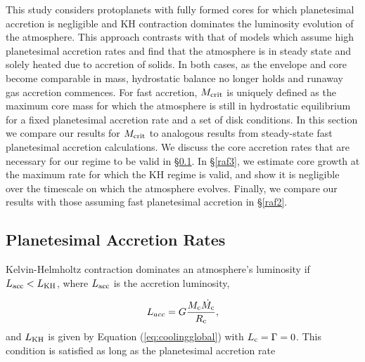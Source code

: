 

This study considers protoplanets with fully formed cores for which planetesimal accretion is negligible and KH contraction dominates the luminosity evolution of the atmosphere. This approach contrasts with that of models which assume high planetesimal accretion rates and find that the atmosphere is in steady state and solely heated due to accretion of solids. In both cases, as the envelope and core become comparable in mass, hydrostatic balance no longer holds and runaway gas accretion commences. For fast accretion, $M_{\rm crit}$ is uniquely defined as the maximum core mass for which the atmosphere is still in hydrostatic equilibrium for a fixed planetesimal accretion rate and a set of disk conditions. In this section we compare our results for $M_{\rm crit}$ to analogous results from steady-state fast planetesimal accretion calculations. We discuss the core accretion rates that are necessary for our regime to be valid in \S\ref{raf1}. In \S\ref{raf3}, we estimate core growth at the maximum rate for which the KH regime is valid, and show it is negligible over the timescale on which the atmosphere evolves. Finally, we compare our results with those assuming fast planetesimal accretion in \S\ref{raf2}.


\subsection{Planetesimal Accretion Rates}
\label{raf1}

Kelvin-Helmholtz contraction dominates an atmosphere's luminosity if  $L_{\mathrm{acc}} < L_{\rm{KH}}$, where $L_{\rm{acc}}$ is the accretion luminosity,

\begin{equation}
\label{eq:Lacc}
L_{acc}=G \frac{M_{\rm{c}} \dot{M_{\rm{c}}}}{R_{\rm{c}}},
\end{equation}
and $L_{\rm KH}$ is given by Equation (\ref{eq:coolingglobal}) with $L_{\rm c}=\Gamma=0$. This condition is satisfied as long as the planetesimal accretion rate 

